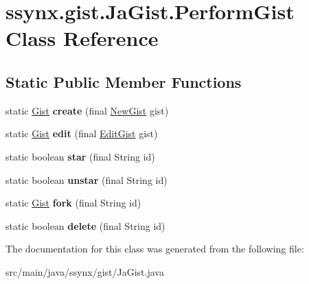 \hypertarget{classssynx_1_1gist_1_1JaGist_1_1PerformGist}{}\section{ssynx.\+gist.\+Ja\+Gist.\+Perform\+Gist Class Reference}
\label{classssynx_1_1gist_1_1JaGist_1_1PerformGist}
\subsection*{Static Public Member Functions}
\begin{DoxyCompactItemize}
\item 
\mbox{\label{classssynx_1_1gist_1_1JaGist_1_1PerformGist_a31c3c40744cd0bd733f37d2f72391391}} 
static \hyperlink{classssynx_1_1gist_1_1Gist}{Gist} {\bfseries create} (final \hyperlink{classssynx_1_1gist_1_1NewGist}{New\+Gist} gist)
\item 
\mbox{\label{classssynx_1_1gist_1_1JaGist_1_1PerformGist_a641d3eb04fd6eea90852a09e161b20ef}} 
static \hyperlink{classssynx_1_1gist_1_1Gist}{Gist} {\bfseries edit} (final \hyperlink{classssynx_1_1gist_1_1EditGist}{Edit\+Gist} gist)
\item 
\mbox{\label{classssynx_1_1gist_1_1JaGist_1_1PerformGist_aec33fe3614d0862f4280ee32feb2b558}} 
static boolean {\bfseries star} (final String id)
\item 
\mbox{\label{classssynx_1_1gist_1_1JaGist_1_1PerformGist_aa54ceda956caacdaee38a0a28ef533ea}} 
static boolean {\bfseries unstar} (final String id)
\item 
\mbox{\label{classssynx_1_1gist_1_1JaGist_1_1PerformGist_afdc5bac2396bf40be8746bc9da384365}} 
static \hyperlink{classssynx_1_1gist_1_1Gist}{Gist} {\bfseries fork} (final String id)
\item 
\mbox{\label{classssynx_1_1gist_1_1JaGist_1_1PerformGist_afaeacc6d2571c0f6f545f62def8b62f8}} 
static boolean {\bfseries delete} (final String id)
\end{DoxyCompactItemize}


The documentation for this class was generated from the following file\+:\begin{DoxyCompactItemize}
\item 
src/main/java/ssynx/gist/Ja\+Gist.\+java\end{DoxyCompactItemize}
